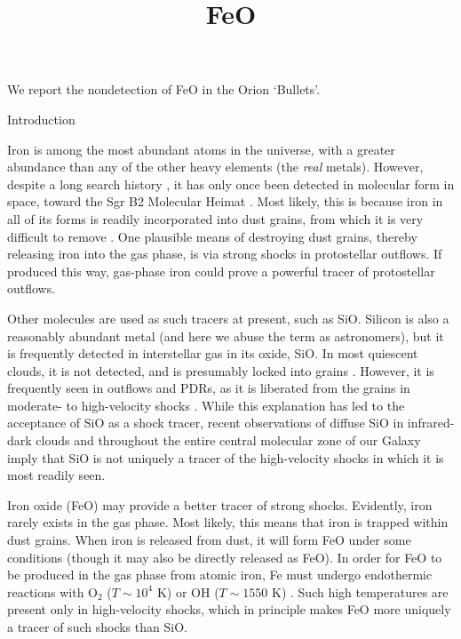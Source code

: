 \documentclass[twocolumn]{aastex61}
\begin{document}
\title{FeO}
We report the nondetection of FeO in the Orion `Bullets'.

Introduction

Iron is among the most abundant atoms in the universe, with a greater abundance
than any of the other heavy elements (the \emph{real} metals).  However,
despite a long search history \citep{Merer1982a}, it has only once been
detected in molecular form in space, toward the Sgr B2 Molecular Heimat
\citep{Walmsley2002a,Furuya2003a}.  Most likely, this is because iron in all of
its forms is readily incorporated into dust grains, from which it is very
difficult to remove \citep{Silvia2012a,Nozawa2003a}.  One plausible means
of destroying dust grains, thereby releasing iron into the gas phase, is
via strong shocks in protostellar outflows.  If produced this way, gas-phase
iron could prove a powerful tracer of protostellar outflows.

Other molecules are used as such tracers at present, such as SiO.  Silicon is
also a reasonably abundant metal (and here we abuse the term as astronomers),
but it is frequently detected in interstellar gas in its oxide, SiO.  In most
quiescent clouds, it is not detected, and is presumably locked into grains
\citep{Ziurys1989a}.  However, it is frequently seen in outflows and PDRs, as
it is liberated from the grains in moderate- to high-velocity shocks
\citep[$v_s>10$
\kms;][]{Schilke1997a,Schilke2001a,Jimenez-Serra2008a,Anderl2013a,Gusdorf2008a,Gusdorf2008b}.
While this explanation has led to the acceptance of SiO as a shock tracer,
recent observations of diffuse SiO in infrared-dark clouds
\citep{Jimenez-Serra2010a} and throughout the entire central molecular zone of
our Galaxy \citep{Jones2012a} imply that SiO is not uniquely a tracer of the
high-velocity shocks in which it is most readily seen.

Iron oxide (FeO) may provide a better tracer of strong shocks.  Evidently, iron
rarely exists in the gas phase.  Most likely, this means that iron is trapped
within dust grains.  When iron is released from dust, it will form FeO under
some conditions (though it may also be directly released as FeO).  In order for
FeO to be produced in the gas phase from atomic iron, Fe must undergo
endothermic reactions with O$_2$ ($T\sim10^4$ K) or OH ($T\sim1550$ K)
\citep{Walmsley2002a}. Such high temperatures are present only in high-velocity
shocks, which in principle makes FeO more uniquely a tracer of such shocks
than SiO.
\end{document}
